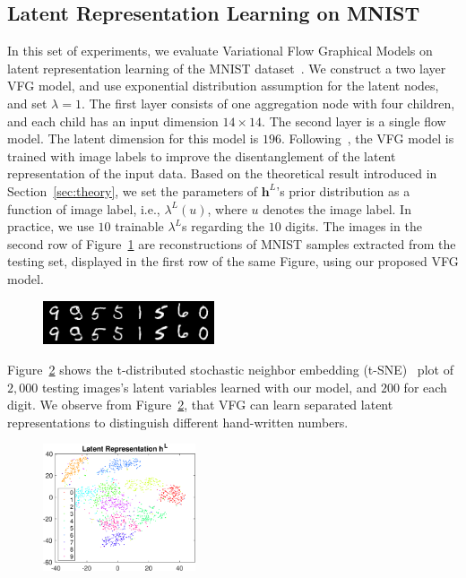 \documentclass[twoside]{article}
\begin{document}
\subsection{Latent Representation Learning on MNIST}\label{sec:exp:mnist}
\vspace{-0.05in}
In this set of experiments, we evaluate  Variational Flow Graphical Models on latent representation learning of the MNIST dataset~\cite{lecun-mnisthandwrittendigit-2010}. 
We construct a two layer VFG model, and use exponential distribution assumption for the latent nodes, and set $\lambda=1$. 
The first layer consists of one aggregation node with four children, and each child has an input dimension $14\times 14$. 
The second layer is a single flow model.
The latent dimension for this model is $196$. 
Following~\cite{Sorrenson2020}, the VFG model is trained with image labels to improve the disentanglement of the latent representation of the input data. 
Based on the theoretical result introduced in Section~\ref{sec:theory}, we set the parameters of $\mathbf{h}^L$'s prior distribution as a function of image label, i.e., $\lambda^L(u)$, where $u$ denotes the image label. 
In practice, we use $10$ trainable $\lambda^L$s regarding the $10$ digits. 
The images in the second row of Figure~\ref{fig:reconst} are reconstructions of MNIST samples extracted from the testing set, displayed in the first row of the same Figure, using our proposed VFG model.  
\begin{figure}[H]
    \centering
       \includegraphics[width=0.45\textwidth]{fig/reconst_Y.png}
    \label{fig:reconst}
\end{figure}
Figure~\ref{fig:z_tsne} shows the t-distributed stochastic neighbor embedding (t-SNE)~\cite{maaten2008visualizing} plot of $2,000$ testing images's latent variables  learned with our model, and $200$ for each digit. 
We observe from Figure~\ref{fig:z_tsne}, that VFG can learn separated latent representations to distinguish different hand-written numbers.
\vspace{-0.05in}
\begin{figure}[H]
    \centering
       \includegraphics[width=0.4\textwidth]{fig/z_Y.eps}
    \label{fig:z_tsne}
\end{figure}
\end{document}
